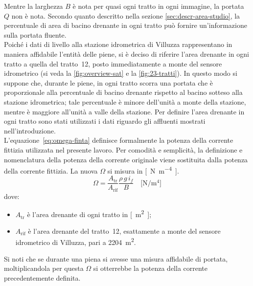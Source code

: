 Mentre la larghezza $B$ è nota per quasi ogni tratto in ogni immagine, la portata $Q$ non è nota.
Secondo quanto descritto nella sezione \ref{sec:descr-area-studio},
la percentuale di area di bacino drenante in ogni tratto può fornire un'informazione sulla portata fluente.
\\
Poiché i dati di livello alla stazione idrometrica di Villuzza rappresentano in maniera affidabile l'entità delle piene, si è deciso di riferire l'area drenante in ogni tratto a quella del tratto~12, posto immediatamente a monte del sensore idrometrico (si veda la \cref{fig:overview-sat} e la \cref{fig:23-tratti}).
In questo modo si suppone che, durante le piene, in ogni tratto scorra una portata che è proporzionale alla percentuale di bacino drenante rispetto al bacino sotteso alla stazione idrometrica; tale percentuale è minore dell'unità a monte della stazione, mentre è maggiore all'unità a valle della stazione.
Per definire l'area drenante in ogni tratto sono stati utilizzati i dati riguardo gli affluenti mostrati nell'introduzione.
\\
L'equazione~\eqref{eq:omega-finta} definisce formalmente la potenza della corrente fittizia utilizzata nel presente lavoro.
Per comodità e semplicità, la definizione e nomenclatura della potenza della corrente originale viene sostituita dalla potenza della corrente fittizia.
La nuova $\Omega$ si misura in \si{[\newton\per\metre\tothe{4}]}.
%
\begin{equation}
	\label{eq:omega-finta}
	\Omega = \frac{A_\mathrm{tr}}{A_\mathrm{rif}} \frac{\rho \, g \, i_f}{B}
	\quad
	\si{[\newton\per\metre\tothe{4}]}
\end{equation}
%
dove:
%
\begin{itemize}
	\item $A_\mathrm{tr}$ è l'area drenante di ogni tratto in \si{[\m\tothe{2}]};
	\item $A_\mathrm{rif}$ è l'area drenante del tratto~12, esattamente a monte del sensore idrometrico di Villuzza, pari a \SI{2204}{\m\tothe{2}}.
\end{itemize}
%
Si noti che se durante una piena si avesse una misura affidabile di portata, moltiplicandola per questa $\Omega$ si otterrebbe la potenza della corrente precedentemente definita.

